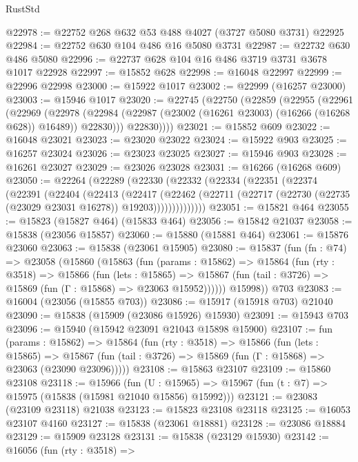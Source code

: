 \begin{lexlean}{RustStd}
\begin{coremodule}
@22978 := @22752 @268 @632 @53 @488 @4027 (@3727 @5080 @3731) @22925
@22984 := @22752 @630 @104 @486 @16 @5080 @3731
@22987 := @22732 @630 @486 @5080
@22996 := @22737 @628 @104 @16 @486 @3719 @3731 @3678 @1017 @22928
@22997 := @15852 @628
@22998 := @16048 @22997
@22999 := @22996 @22998
@23000 := @15922 @1017
@23002 := @22999 (@16257 @23000)
@23003 := @15946 @1017
@23020 := @22745
    (@22750
      (@22859
        (@22955
          (@22961
            (@22969
              (@22978
                (@22984 (@22987 (@23002 (@16261 @23003) (@16266 (@16268 @628)) @16489)) @22830)))
            @22830))))
@23021 := @15852 @609
@23022 := @16048 @23021
@23023 := @23020 @23022
@23024 := @15922 @903
@23025 := @16257 @23024
@23026 := @23023 @23025
@23027 := @15946 @903
@23028 := @16261 @23027
@23029 := @23026 @23028
@23031 := @16266 (@16268 @609)
@23050 := @22264
    (@22289
      (@22330
        (@22332
          (@22334
            (@22351
              (@22374
                (@22391
                  (@22404
                    (@22413
                      (@22417
                        (@22462
                          (@22711
                            (@22717 (@22730 (@22735 (@23029 @23031 @16278)) @19203))))))))))))))
@23051 := @15821 @464
@23055 := @15823 (@15827 @464) (@15833 @464)
@23056 := @15842 @21037
@23058 := @15838 (@23056 @15857)
@23060 := @15880 (@15881 @464)
@23061 := @15876 @23060
@23063 := @15838 (@23061 @15905)
@23080 := @15837
    (fun (fn : @74) =>
    @23058
      (@15860
        (@15863
          (fun (params : @15862) =>
          @15864
            (fun (rty : @3518) =>
            @15866
              (fun (lets : @15865) =>
              @15867 (fun (tail : @3726) => @15869 (fun (Γ : @15868) => @23063 @15952))))))
        @15998))
    @703
@23083 := @16004 (@23056 (@15855 @703))
@23086 := @15917 (@15918 @703) @21040
@23090 := @15838 (@15909 (@23086 @15926) @15930)
@23091 := @15943 @703
@23096 := @15940 (@15942 @23091 @21043 @15898 @15900)
@23107 := fun (params : @15862) =>
  @15864
    (fun (rty : @3518) =>
    @15866
      (fun (lets : @15865) =>
      @15867 (fun (tail : @3726) => @15869 (fun (Γ : @15868) => @23063 (@23090 @23096)))))
@23108 := @15863 @23107
@23109 := @15860 @23108
@23118 := @15966
    (fun (U : @15965) => @15967 (fun (t : @7) => @15975 (@15838 (@15981 @21040 @15856) @15992)))
@23121 := @23083 (@23109 @23118) @21038
@23123 := @15823 @23108 @23118
@23125 := @16053 @23107 @4160
@23127 := @15838 (@23061 @18881)
@23128 := @23086 @18884
@23129 := @15909 @23128
@23131 := @15838 (@23129 @15930)
@23142 := @16056
    (fun (rty : @3518) =>

\end{coremodule}
\end{lexlean}
